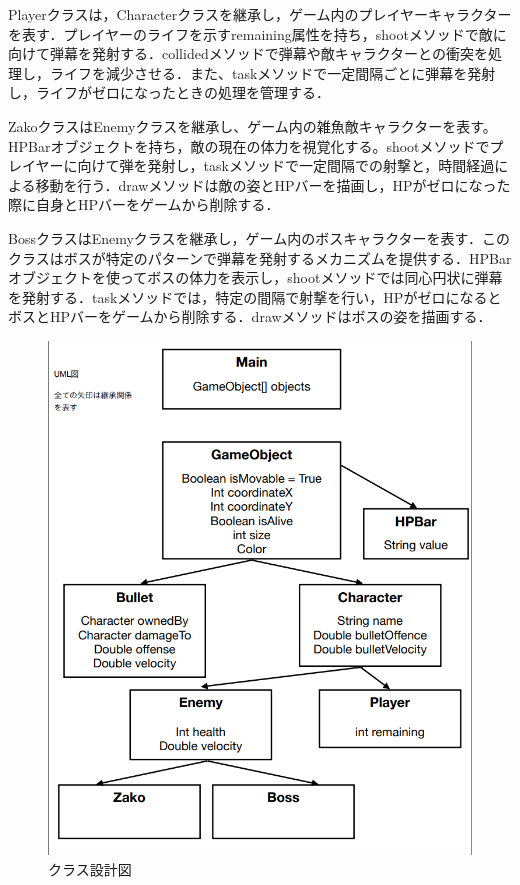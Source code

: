 \documentclass[dvipdfmx]{jlreq}
\begin{document}
Playerクラスは，Characterクラスを継承し，ゲーム内のプレイヤーキャラクターを表す．プレイヤーのライフを示すremaining属性を持ち，shootメソッドで敵に向けて弾幕を発射する．collidedメソッドで弾幕や敵キャラクターとの衝突を処理し，ライフを減少させる．また、taskメソッドで一定間隔ごとに弾幕を発射し，ライフがゼロになったときの処理を管理する．

ZakoクラスはEnemyクラスを継承し、ゲーム内の雑魚敵キャラクターを表す。HPBarオブジェクトを持ち，敵の現在の体力を視覚化する。shootメソッドでプレイヤーに向けて弾を発射し，taskメソッドで一定間隔での射撃と，時間経過による移動を行う．drawメソッドは敵の姿とHPバーを描画し，HPがゼロになった際に自身とHPバーをゲームから削除する．

BossクラスはEnemyクラスを継承し，ゲーム内のボスキャラクターを表す．このクラスはボスが特定のパターンで弾幕を発射するメカニズムを提供する．HPBarオブジェクトを使ってボスの体力を表示し，shootメソッドでは同心円状に弾幕を発射する．taskメソッドでは，特定の間隔で射撃を行い，HPがゼロになるとボスとHPバーをゲームから削除する．drawメソッドはボスの姿を描画する．

\begin{figure}[H]
  \centering
  \includegraphics[width=150mm]{figures/class.png}
  \caption{クラス設計図}
  \label{fig:model}
\end{figure}
\end{document}
